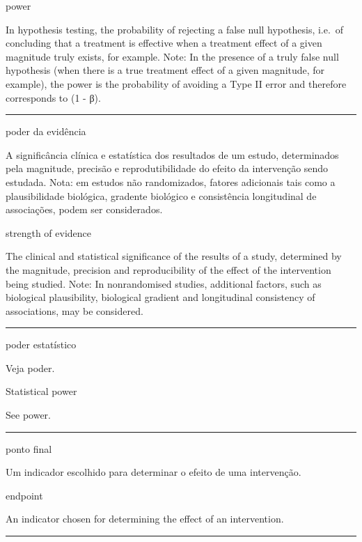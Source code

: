 \documentclass[
]{book}
\begin{document}
power

In hypothesis testing, the probability of rejecting a false null hypothesis, i.e.~of concluding that a treatment is effective when a treatment effect of a given magnitude truly exists, for example. Note: In the presence of a truly false null hypothesis (when there is a true treatment effect of a given magnitude, for example), the power is the probability of avoiding a Type II error and therefore corresponds to (1 - β).

\begin{center}\rule{0.5\linewidth}{0.5pt}\end{center}

poder da evidência

A significância clínica e estatística dos resultados de um estudo, determinados pela magnitude, precisão e reprodutibilidade do efeito da intervenção sendo estudada. Nota: em estudos não randomizados, fatores adicionais tais como a plausibilidade biológica, gradente biológico e consistência longitudinal de associações, podem ser considerados.

strength of evidence

The clinical and statistical significance of the results of a study, determined by the magnitude, precision and reproducibility of the effect of the intervention being studied. Note: In nonrandomised studies, additional factors, such as biological plausibility, biological gradient and longitudinal consistency of associations, may be considered.

\begin{center}\rule{0.5\linewidth}{0.5pt}\end{center}

poder estatístico

Veja poder.

Statistical power

See power.

\begin{center}\rule{0.5\linewidth}{0.5pt}\end{center}

ponto final

Um indicador escolhido para determinar o efeito de uma intervenção.

endpoint

An indicator chosen for determining the effect of an intervention.

\begin{center}\rule{0.5\linewidth}{0.5pt}\end{center}
\end{document}
